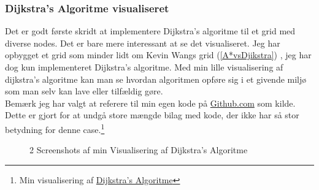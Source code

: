 \documentclass[12pt]{article}
\begin{document}
\subsubsection{Dijkstra’s Algoritme visualiseret}
Det er godt første skridt at implementere Dijkstra's algoritme til et grid med diverse nodes. Det er bare mere interessant at se det visualiseret. Jeg har opbygget et grid som minder lidt om Kevin Wangs grid (\ref{A*vsDjikstra}) , jeg har dog kun implementeret Dijkstra’s algoritme. Med min lille visualisering af dijkstra’s algoritme kan man se hvordan algoritmen opføre sig i et givende miljø som man selv kan lave eller tilfældig gøre. \\
Bemærk jeg har valgt at referere til min egen kode på \href{https://github.com/}{Github.com} som kilde. Dette er gjort for at undgå store mængde bilag med kode, der ikke har så stor betydning for denne case.\footnote{Min visualisering af \href{https://github.com/johannes67890/Pathfinding.git}{Dijkstra’s Algoritme}}     
\begin{figure}[ht]%
  \centering
  \caption{2 Screenshots af min Visualisering af Dijkstra’s Algoritme}%
\end{figure}
\end{document}
